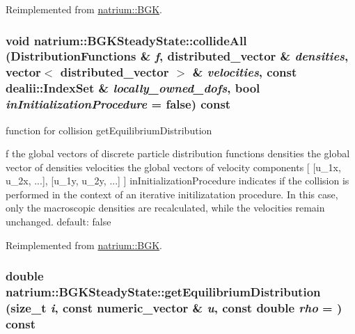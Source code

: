 Reimplemented from \hyperlink{classnatrium_1_1BGK_a430f5020b6101a64d89a0cc2a246260e}{natrium::BGK}.\hypertarget{classnatrium_1_1BGKSteadyState_a8554fb624c5a3abe01651747b3d9aeb7}{
\subsubsection[{collideAll}]{\setlength{\rightskip}{0pt plus 5cm}void natrium::BGKSteadyState::collideAll ({\bf DistributionFunctions} \& {\em f}, \/  distributed\_\-vector \& {\em densities}, \/  vector$<$ distributed\_\-vector $>$ \& {\em velocities}, \/  const dealii::IndexSet \& {\em locally\_\-owned\_\-dofs}, \/  bool {\em inInitializationProcedure} = {\ttfamily false}) const}}
\label{classnatrium_1_1BGKSteadyState_a8554fb624c5a3abe01651747b3d9aeb7}


function for collision getEquilibriumDistribution

f the global vectors of discrete particle distribution functions densities the global vector of densities velocities the global vectors of velocity components \mbox{[} \mbox{[}u\_\-1x, u\_\-2x, ...\mbox{]}, \mbox{[}u\_\-1y, u\_\-2y, ...\mbox{]} \mbox{]} inInitializationProcedure indicates if the collision is performed in the context of an iterative initilizatation procedure. In this case, only the macroscopic densities are recalculated, while the velocities remain unchanged. default: false 

Reimplemented from \hyperlink{classnatrium_1_1BGK_a9fa1c980217a183fc4762954e86ba36d}{natrium::BGK}.\hypertarget{classnatrium_1_1BGKSteadyState_ad99d9159cc14b5897bea7f145c3b39ca}{
\subsubsection[{getEquilibriumDistribution}]{\setlength{\rightskip}{0pt plus 5cm}double natrium::BGKSteadyState::getEquilibriumDistribution (size\_\-t {\em i}, \/  const numeric\_\-vector \& {\em u}, \/  const double {\em rho} = {}) const}}
\label{classnatrium_1_1BGKSteadyState_ad99d9159cc14b5897bea7f145c3b39ca}


